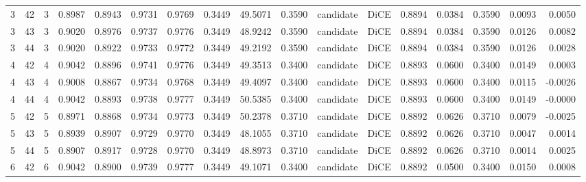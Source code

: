 \begin{tabular}{rrrrrrrrrrllrrrrr}
  3 &    42 &            3 &  0.8987 &   0.8943 &     0.9731 &      0.9769 &           0.3449 &      49.5071 &  0.3590 & candidate &   DiCE &          0.8894 &               0.0384 &                     0.3590 &   0.0093 &    0.0050 \\
  3 &    43 &            3 &  0.9020 &   0.8976 &     0.9737 &      0.9776 &           0.3449 &      48.9242 &  0.3590 & candidate &   DiCE &          0.8894 &               0.0384 &                     0.3590 &   0.0126 &    0.0082 \\
  3 &    44 &            3 &  0.9020 &   0.8922 &     0.9733 &      0.9772 &           0.3449 &      49.2192 &  0.3590 & candidate &   DiCE &          0.8894 &               0.0384 &                     0.3590 &   0.0126 &    0.0028 \\
  4 &    42 &            4 &  0.9042 &   0.8896 &     0.9741 &      0.9776 &           0.3449 &      49.3513 &  0.3400 & candidate &   DiCE &          0.8893 &               0.0600 &                     0.3400 &   0.0149 &    0.0003 \\
  4 &    43 &            4 &  0.9008 &   0.8867 &     0.9734 &      0.9768 &           0.3449 &      49.4097 &  0.3400 & candidate &   DiCE &          0.8893 &               0.0600 &                     0.3400 &   0.0115 &   -0.0026 \\
  4 &    44 &            4 &  0.9042 &   0.8893 &     0.9738 &      0.9777 &           0.3449 &      50.5385 &  0.3400 & candidate &   DiCE &          0.8893 &               0.0600 &                     0.3400 &   0.0149 &   -0.0000 \\
  5 &    42 &            5 &  0.8971 &   0.8868 &     0.9734 &      0.9773 &           0.3449 &      50.2378 &  0.3710 & candidate &   DiCE &          0.8892 &               0.0626 &                     0.3710 &   0.0079 &   -0.0025 \\
  5 &    43 &            5 &  0.8939 &   0.8907 &     0.9729 &      0.9770 &           0.3449 &      48.1055 &  0.3710 & candidate &   DiCE &          0.8892 &               0.0626 &                     0.3710 &   0.0047 &    0.0014 \\
  5 &    44 &            5 &  0.8907 &   0.8917 &     0.9728 &      0.9770 &           0.3449 &      48.8973 &  0.3710 & candidate &   DiCE &          0.8892 &               0.0626 &                     0.3710 &   0.0014 &    0.0025 \\
  6 &    42 &            6 &  0.9042 &   0.8900 &     0.9739 &      0.9777 &           0.3449 &      49.1071 &  0.3400 & candidate &   DiCE &          0.8892 &               0.0500 &                     0.3400 &   0.0150 &    0.0008 \\

\end{tabular}
